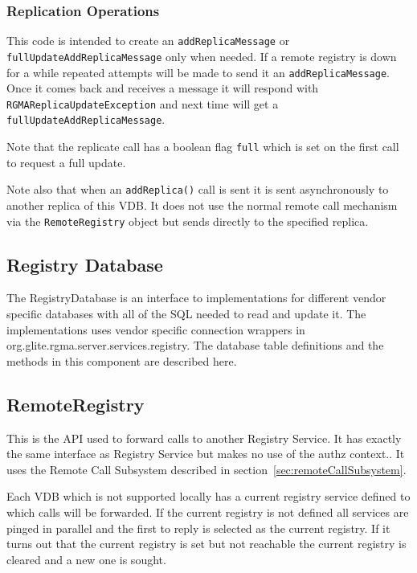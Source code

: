 \subsubsection{Replication Operations}
This code is intended to create an \texttt{addReplicaMessage} or
\texttt{fullUpdateAddReplicaMessage} only when needed. If a remote
registry is down for a while repeated attempts will be made to send it
an \texttt{addReplicaMessage}. Once it comes back and receives a
message it will respond with \texttt{RGMAReplicaUpdateException} and
next time will get a \texttt{fullUpdateAddReplicaMessage}.

Note that the replicate call has a boolean flag \texttt{full} which is
set on the first call to request a full update.

Note also that when an \texttt{addReplica()} call is sent it is sent
asynchronously to another replica of this VDB. It does not use the
normal remote call mechanism via the \texttt{RemoteRegistry} object
but sends directly to the specified replica.



\subsection{Registry Database}

The RegistryDatabase is an interface to implementations for different
vendor specific databases with all of the SQL needed to read and
update it. The implementations uses vendor specific connection
wrappers in org.glite.rgma.server.services.registry. The database
table definitions and the methods in this component are described
here.


\subsection{RemoteRegistry}
\label{sec:RemoteRegistry}

This is the API used to forward calls to another Registry Service. It
has exactly the same interface as Registry Service but makes no use of
the authz context..  It uses the Remote Call Subsystem described in
section~\ref{sec:remoteCallSubsystem}. 

Each VDB which is not supported locally has a current registry service defined
to which calls will be forwarded. If the current registry is not defined all
services are pinged in parallel and the first to reply is selected as the
current registry. If it turns out that the current registry is set but not
reachable the current registry is cleared and a new one is sought.